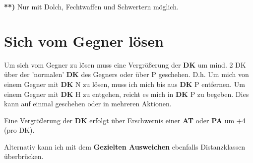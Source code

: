 \textbf{**)} Nur mit Dolch, Fechtwaffen und Schwertern möglich.

\section{Sich vom Gegner lösen}
Um sich vom Gegner zu lösen muss eine Vergrößerung der \textbf{DK} um mind. 2
DK über der 'normalen' \textbf{DK} des Gegners oder über P geschehen. D.h. Um
mich von einem Gegner mit \textbf{DK} N zu lösen, muss ich mich bis aus
\textbf{DK} P entfernen. Um einem Gegner mit \textbf{DK} H zu entgehen,
reicht es mich in \textbf{DK} P zu begeben. Dies kann auf einmal geschehen
oder in mehreren Aktionen.

Eine Vergrößerung der \textbf{DK} erfolgt über Erschwernis einer \textbf{AT}
\underline{oder} \textbf{PA} um +4 (pro DK).

Alternativ kann ich mit dem \textbf{Gezielten Ausweichen} ebenfalls
Distanzklassen überbrücken.
